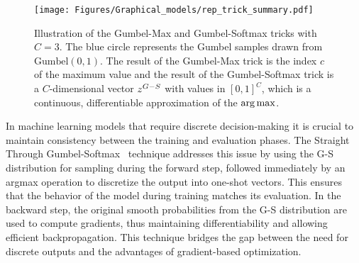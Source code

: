 \begin{figure}[htb]
    \centering
    \texttt{[image: Figures/Graphical\_models/rep\_trick\_summary.pdf]}
    \caption{Illustration of the Gumbel-Max and Gumbel-Softmax tricks with $C=3$.
    The blue circle represents the Gumbel samples drawn from  $\text{Gumbel}(0,1)$.
    The result of the Gumbel-Max trick is the index $c$ of the maximum value and 
    the result of the Gumbel-Softmax trick is a $C$-dimensional vector $z^{G-S}$ with values in $[0,1]^C$,
    which is a continuous, differentiable approximation of the $\operatorname*{arg\,max}$.
    }
    \label{fig:rt_gumbel_summary}
\end{figure}


\begin{remark}
    \label{rem:gumbel_softmax}
    In machine learning models that require discrete decision-making 
    it is crucial to
    maintain consistency between the training and evaluation phases. The
    Straight Through Gumbel-Softmax~\citep{maddison2016concrete} technique addresses 
    this issue by using the
    G-S distribution for sampling during the forward step, followed
    immediately by an argmax operation to discretize the output into one-shot
    vectors. This ensures that the behavior of the model during training matches
    its evaluation. In the backward
    step, the original smooth probabilities from the G-S  distribution
    are used to compute gradients, thus maintaining differentiability and
    allowing efficient backpropagation. 
    This technique bridges the gap between
    the need for discrete outputs and the advantages of gradient-based
    optimization.
\end{remark}




